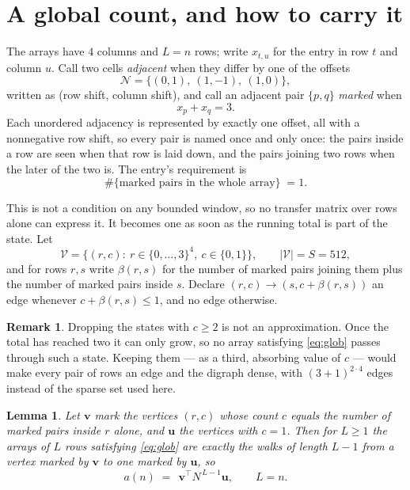 \documentclass[11pt,a4paper]{article}
\theoremstyle{plain}
\newtheorem{lemma}[theorem]{Lemma}
\theoremstyle{definition}
\newtheorem{remark}[theorem]{Remark}
\begin{document}
\section{A global count, and how to carry it}

The arrays have $4$ columns and $L=n$ rows; write $x_{t,u}$ for the entry in
row $t$ and column $u$. Call two cells \emph{adjacent} when they differ by one of the
offsets
\[
\mathcal N=\{(0,1),\ (1,-1),\ (1,0)\},
\]
written as (row shift, column shift), and call an adjacent pair $\{p,q\}$
\emph{marked} when
\[
x_{p}+x_{q}=3 .
\]
Each unordered adjacency is represented by exactly one offset, all with a nonnegative row
shift, so every pair is named once and only once: the pairs inside a row are seen when
that row is laid down, and the pairs joining two rows when the later of the two is. The
entry's requirement is
\begin{equation}\label{eq:glob}
\#\{\text{marked pairs in the whole array}\}\;=1.
\end{equation}

This is not a condition on any bounded window, so no transfer matrix over rows alone can
express it. It becomes one as soon as the running total is part of the state. Let
\[
\mathcal V=\bigl\{(r,c):\ r\in\{0,\dots,3\}^{4},\ c\in\{0,1\}\bigr\},
\qquad |\mathcal V|=S=512,
\]
and for rows $r,s$ write $\beta(r,s)$ for the number of marked pairs joining them plus the
number of marked pairs inside $s$. Declare $(r,c)\to(s,c+\beta(r,s))$ an edge whenever
$c+\beta(r,s)\le1$, and no edge otherwise.

\begin{remark}
Dropping the states with $c\ge2$ is not an approximation. Once the total has reached two it
can only grow, so no array satisfying \eqref{eq:glob} passes through such a state. Keeping
them --- as a third, absorbing value of $c$ --- would make every pair of rows an edge and
the digraph dense, with $(3+1)^{2\cdot4}$ edges instead of the sparse set used here.
\end{remark}

\begin{lemma}\label{lem:walk}
Let $\mathbf{v}$ mark the vertices $(r,c)$ whose count $c$ equals the number of marked pairs
inside $r$ alone, and $\mathbf{u}$ the vertices with $c=1$. Then for $L\ge1$ the arrays
of $L$ rows satisfying \eqref{eq:glob} are exactly the walks of length $L-1$ from a
vertex marked by $\mathbf{v}$ to one marked by $\mathbf{u}$, so
\[
a(n)\;=\;\,\mathbf{v}^{\!\top}N^{\,L-1}\mathbf{u},\qquad L=n .
\]
\end{lemma}
\end{document}
